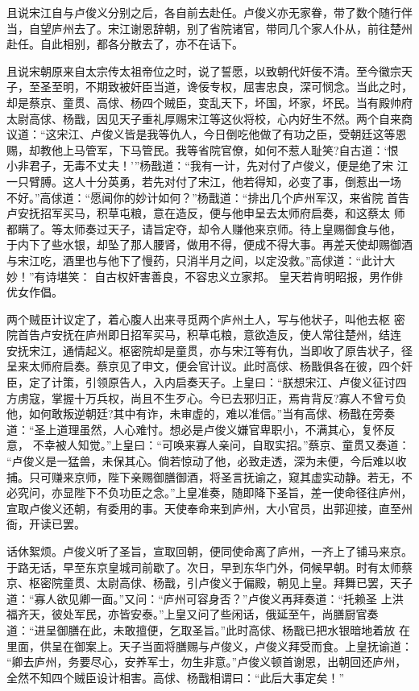 且说宋江自与卢俊义分别之后，各自前去赴任。卢俊义亦无家眷，带了数个随行伴
当，自望庐州去了。宋江谢恩辞朝，别了省院诸官，带同几个家人仆从，前往楚州
赴任。自此相别，都各分散去了，亦不在话下。

且说宋朝原来自太宗传太祖帝位之时，说了誓愿，以致朝代奸佞不清。至今徽宗天
子，至圣至明，不期致被奸臣当道，谗佞专权，屈害忠良，深可悯念。当此之时，
却是蔡京、童贯、高俅、杨四个贼臣，变乱天下，坏国，坏家，坏民。当有殿帅府
太尉高俅、杨戬，因见天子重礼厚赐宋江等这伙将校，心内好生不然。两个自来商
议道：“这宋江、卢俊义皆是我等仇人，今日倒吃他做了有功之臣，受朝廷这等恩
赐，却教他上马管军，下马管民。我等省院官僚，如何不惹人耻笑?自古道：‘恨
小非君子，无毒不丈夫！’”杨戬道：“我有一计，先对付了卢俊义，便是绝了宋
江一只臂膊。这人十分英勇，若先对付了宋江，他若得知，必变了事，倒惹出一场
不好。”高俅道：“愿闻你的妙计如何？”杨戬道：“排出几个庐州军汉，来省院
首告卢安抚招军买马，积草屯粮，意在造反，便与他申呈去太师府启奏，和这蔡太
师都瞒了。等太师奏过天子，请旨定夺，却令人赚他来京师。待上皇赐御食与他，
于内下了些水银，却坠了那人腰肾，做用不得，便成不得大事。再差天使却赐御酒
与宋江吃，酒里也与他下了慢药，只消半月之间，以定没救。”高俅道：“此计大
妙！”有诗堪笑：
自古权奸害善良，不容忠义立家邦。
皇天若肯明昭报，男作俳优女作倡。

两个贼臣计议定了，着心腹人出来寻觅两个庐州土人，写与他状子，叫他去枢
密院首告卢安抚在庐州即日招军买马，积草屯粮，意欲造反，使人常往楚州，结连
安抚宋江，通情起义。枢密院却是童贯，亦与宋江等有仇，当即收了原告状子，径
呈来太师府启奏。蔡京见了申文，便会官计议。此时高俅、杨戬俱各在彼，四个奸
臣，定了计策，引领原告人，入内启奏天子。上皇曰：“朕想宋江、卢俊义征讨四
方虏寇，掌握十万兵权，尚且不生歹心。今已去邪归正，焉肯背反?寡人不曾亏负
他，如何敢叛逆朝廷?其中有诈，未审虚的，难以准信。”当有高俅、杨戬在旁奏
道：“圣上道理虽然，人心难忖。想必是卢俊义嫌官卑职小，不满其心，复怀反意，
不幸被人知觉。”上皇曰：“可唤来寡人亲问，自取实招。”蔡京、童贯又奏道：
“卢俊义是一猛兽，未保其心。倘若惊动了他，必致走透，深为未便，今后难以收
捕。只可赚来京师，陛下亲赐御膳御酒，将圣言抚谕之，窥其虚实动静。若无，不
必究问，亦显陛下不负功臣之念。”上皇准奏，随即降下圣旨，差一使命径往庐州，
宣取卢俊义还朝，有委用的事。天使奉命来到庐州，大小官员，出郭迎接，直至州
衙，开读已罢。

话休絮烦。卢俊义听了圣旨，宣取回朝，便同使命离了庐州，一齐上了铺马来京。
于路无话，早至东京皇城司前歇了。次日，早到东华门外，伺候早朝。时有太师蔡
京、枢密院童贯、太尉高俅、杨戬，引卢俊义于偏殿，朝见上皇。拜舞已罢，天子
道：“寡人欲见卿一面。”又问：“庐州可容身否？”卢俊义再拜奏道：“托赖圣
上洪福齐天，彼处军民，亦皆安泰。”上皇又问了些闲话，俄延至午，尚膳厨官奏
道：“进呈御膳在此，未敢擅便，乞取圣旨。”此时高俅、杨戬已把水银暗地着放
在里面，供呈在御案上。天子当面将膳赐与卢俊义，卢俊义拜受而食。上皇抚谕道：
“卿去庐州，务要尽心，安养军士，勿生非意。”卢俊义顿首谢恩，出朝回还庐州，
全然不知四个贼臣设计相害。高俅、杨戬相谓曰：“此后大事定矣！”

